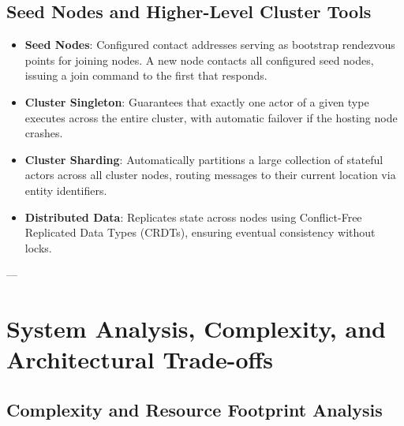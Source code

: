 \subsection{Seed Nodes and Higher-Level Cluster Tools}
\begin{itemize}
    \item \textbf{Seed Nodes}: Configured contact addresses serving as bootstrap rendezvous points for joining nodes. A new node contacts all configured seed nodes, issuing a join command to the first that responds.
    \item \textbf{Cluster Singleton}: Guarantees that exactly one actor of a given type executes across the entire cluster, with automatic failover if the hosting node crashes.
    \item \textbf{Cluster Sharding}: Automatically partitions a large collection of stateful actors across all cluster nodes, routing messages to their current location via entity identifiers.
    \item \textbf{Distributed Data}: Replicates state across nodes using Conflict-Free Replicated Data Types (CRDTs), ensuring eventual consistency without locks.
\end{itemize}

---

\section{System Analysis, Complexity, and Architectural Trade-offs}

\subsection{Complexity and Resource Footprint Analysis}

